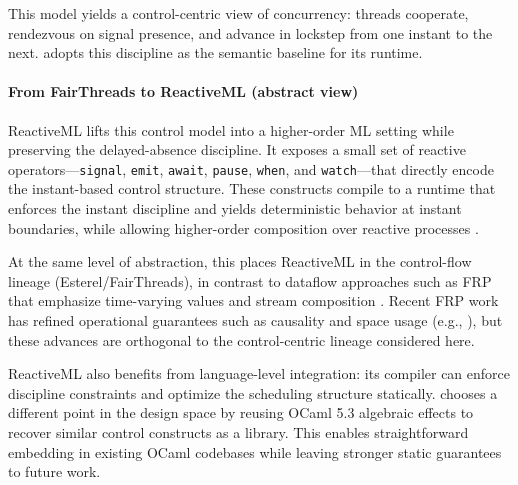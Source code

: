 This model yields a control-centric view of concurrency: threads cooperate,
rendezvous on signal presence, and advance in lockstep from one instant to the
next. \tempo{} adopts this discipline as the semantic baseline for its runtime.

\paragraph{From FairThreads to ReactiveML (abstract view)}
ReactiveML lifts this control model into a higher-order ML setting while
preserving the delayed-absence discipline. It exposes a small set of reactive
operators---\texttt{signal}, \texttt{emit}, \texttt{await}, \texttt{pause},
\texttt{when}, and \texttt{watch}---that directly encode the instant-based
control structure. These constructs compile to a runtime that enforces the
instant discipline and yields deterministic behavior at instant boundaries,
while allowing higher-order composition over reactive processes
\cite{reactiveml2005}.

At the same level of abstraction, this places ReactiveML in the control-flow
lineage (Esterel/FairThreads), in contrast to dataflow approaches such as FRP
that emphasize time-varying values and stream composition \cite{frp1997}.
Recent FRP work has refined operational guarantees such as causality and space
usage (e.g., \cite{perez2016frp,bahr2019ratt,bahr2022modalfrp,bahr2023async}),
but these advances are orthogonal to the control-centric lineage considered
here.

ReactiveML also benefits from language-level integration: its compiler can
enforce discipline constraints and optimize the scheduling structure
statically. \tempo{} chooses a different point in the design space by reusing
OCaml 5.3 algebraic effects to recover similar control constructs as a
library. This enables straightforward embedding in existing OCaml codebases
while leaving stronger static guarantees to future work.
